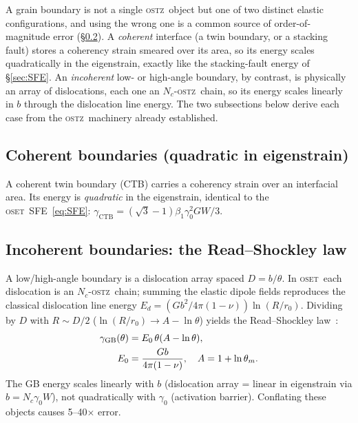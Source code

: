 \documentclass[3p]{elsarticle}
\newcommand{\OSTZ}{\textsc{ostz}}
\newcommand{\OSET}{\textsc{oset}}
\newcommand{\gz}{\gamma_0}
\begin{document}
A grain boundary is not a single \OSTZ\ object but one of two
distinct elastic configurations, and using the wrong one is a
common source of order-of-magnitude error (\S\ref{sec:RS}).
A \emph{coherent} interface (a twin boundary, or a stacking fault)
stores a coherency strain smeared over its area, so its energy
scales quadratically in the eigenstrain, exactly like the
stacking-fault energy of \S\ref{sec:SFE}. An \emph{incoherent}
low- or high-angle boundary, by contrast, is physically an array of
dislocations, each one an $N_c$-\OSTZ\ chain, so its energy scales
linearly in $b$ through the dislocation line energy. The two
subsections below derive each case from the \OSTZ\ machinery
already established.

\subsection{Coherent boundaries (quadratic in eigenstrain)}

A coherent twin boundary (CTB) carries a coherency strain over an
interfacial area. Its energy is \emph{quadratic} in the eigenstrain,
identical to the \OSET\ SFE~\eqref{eq:SFE}:
$\gamma_\text{CTB}=(\sqrt3-1)\beta_1\gz^2GW/3$.

\subsection{Incoherent boundaries: the Read--Shockley law}
\label{sec:RS}

A low/high-angle boundary is a dislocation array spaced $D=b/\theta$.
In \OSET\ each dislocation is an $N_c$-\OSTZ\ chain; summing the elastic
dipole fields reproduces the classical dislocation line energy
$E_d=(Gb^2/4\pi(1-\nu))\ln(R/r_0)$. Dividing by $D$ with
$R\sim D/2$ ($\ln(R/r_0)\to A-\ln\theta$) yields the
Read--Shockley law~\citep{readshockley1950}:
\begin{align}
  \gamma_\text{GB}(\theta)&=E_0\,\theta(A-\ln\theta),
    \label{eq:RS}\\
  E_0&=\frac{Gb}{4\pi(1-\nu)},\quad A=1+\ln\theta_m.\notag
\end{align}
The GB energy scales linearly with $b$ (dislocation array = linear in
eigenstrain via $b=N_c\gz W$), not quadratically with $\gz$
(activation barrier). Conflating these objects causes 5--40$\times$
error.
\end{document}
